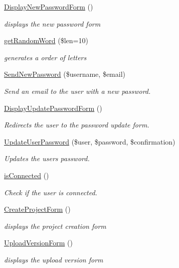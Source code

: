 \begin{DoxyCompactItemize}
\hyperlink{class_user_controller_a805199e1912e0733984fba3f6f0f2bed}{Display\+New\+Password\+Form} ()
\begin{DoxyCompactList}\small\item\em displays the new password form \end{DoxyCompactList}\item 
\hyperlink{class_user_controller_ac8ab29f78e095ed4fda232d64056005e}{get\+Random\+Word} (\$len=10)
\begin{DoxyCompactList}\small\item\em generates a order of letters \end{DoxyCompactList}\item 
\hyperlink{class_user_controller_a41d138126c075a5eafa79894a2f5282b}{Send\+New\+Password} (\$username, \$email)
\begin{DoxyCompactList}\small\item\em Send an email to the user with a new password. \end{DoxyCompactList}\item 
\hyperlink{class_user_controller_a02d05cea0778c17290eeb6291dc43af8}{Display\+Update\+Password\+Form} ()
\begin{DoxyCompactList}\small\item\em Redirects the user to the password update form. \end{DoxyCompactList}\item 
\hyperlink{class_user_controller_a2558cafa4d27cbe1395ba8f85c081cf1}{Update\+User\+Password} (\$user, \$password, \$confirmation)
\begin{DoxyCompactList}\small\item\em Updates the user\textquotesingle{}s password. \end{DoxyCompactList}\item 
\hyperlink{class_user_controller_af160f7fbbf281d018ae3162521b8267d}{is\+Connected} ()
\begin{DoxyCompactList}\small\item\em Check if the user is connected. \end{DoxyCompactList}\item 
\hyperlink{class_user_controller_aaffeeb810115d6a6bce503694b762838}{Create\+Project\+Form} ()
\begin{DoxyCompactList}\small\item\em displays the project creation form \end{DoxyCompactList}\item 
\hyperlink{class_user_controller_a366b14776b9f86442e693b89d265cc6a}{Upload\+Version\+Form} ()
\begin{DoxyCompactList}\small\item\em displays the upload version form \end{DoxyCompactList}\end{DoxyCompactItemize}
